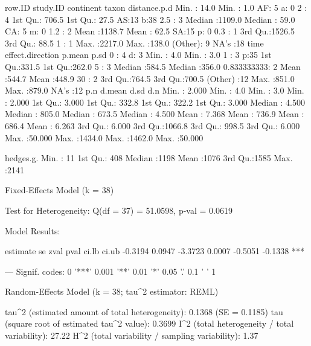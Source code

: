 \documentclass[11pt, a4paper]{article}
\begin{document}
\begin{Schunk}
\begin{Soutput}
     row.ID          study.ID     continent taxon   distance.p.d
 Min.   :  14.0   Min.   :  1.0   AF: 5     a: 0   2      : 4   
 1st Qu.: 706.5   1st Qu.: 27.5   AS:13     b:38   2.5    : 3   
 Median :1109.0   Median : 59.0   CA: 5     m: 0   1.2    : 2   
 Mean   :1138.7   Mean   : 62.5   SA:15     p: 0   0.3    : 1   
 3rd Qu.:1526.5   3rd Qu.: 88.5                    1      : 1   
 Max.   :2217.0   Max.   :138.0                    (Other): 9   
                                                   NA's   :18   
          time    effect.direction     p.mean           p.sd      
 0          : 4   d: 3             Min.   :  4.0   Min.   :  3.0  
 1          : 3   p:35             1st Qu.:331.5   1st Qu.:262.0  
 5          : 3                    Median :584.5   Median :356.0  
 0.833333333: 2                    Mean   :544.7   Mean   :448.9  
 30         : 2                    3rd Qu.:764.5   3rd Qu.:700.5  
 (Other)    :12                    Max.   :851.0   Max.   :879.0  
 NA's       :12                                                   
      p.n             d.mean            d.sd             d.n        
 Min.   : 2.000   Min.   :   4.0   Min.   :   3.0   Min.   : 2.000  
 1st Qu.: 3.000   1st Qu.: 332.8   1st Qu.: 322.2   1st Qu.: 3.000  
 Median : 4.500   Median : 805.0   Median : 673.5   Median : 4.500  
 Mean   : 7.368   Mean   : 736.9   Mean   : 686.4   Mean   : 6.263  
 3rd Qu.: 6.000   3rd Qu.:1066.8   3rd Qu.: 998.5   3rd Qu.: 6.000  
 Max.   :50.000   Max.   :1434.0   Max.   :1462.0   Max.   :50.000  
                                                                    
   hedges.g.   
 Min.   :  11  
 1st Qu.: 408  
 Median :1198  
 Mean   :1076  
 3rd Qu.:1585  
 Max.   :2141  
\end{Soutput}
\begin{Soutput}
Fixed-Effects Model (k = 38)

Test for Heterogeneity: 
Q(df = 37) = 51.0598, p-val = 0.0619

Model Results:

estimate       se     zval     pval    ci.lb    ci.ub          
 -0.3194   0.0947  -3.3723   0.0007  -0.5051  -0.1338      *** 

---
Signif. codes:  0 '***' 0.001 '**' 0.01 '*' 0.05 '.' 0.1 ' ' 1 
\end{Soutput}
\begin{Soutput}
Random-Effects Model (k = 38; tau^2 estimator: REML)

tau^2 (estimated amount of total heterogeneity): 0.1368 (SE = 0.1185)
tau (square root of estimated tau^2 value):      0.3699
I^2 (total heterogeneity / total variability):   27.22%
H^2 (total variability / sampling variability):  1.37


\end{Soutput}
\end{Schunk}
\end{document}
